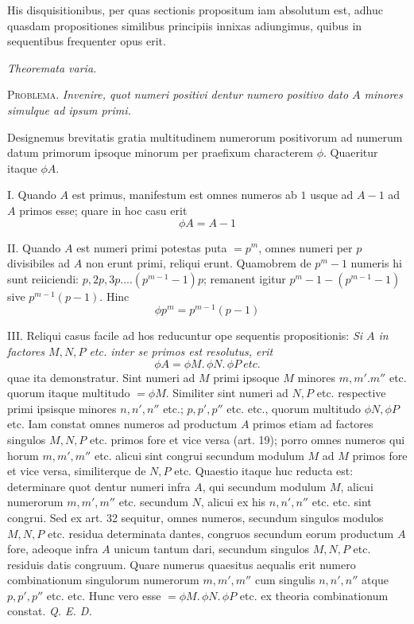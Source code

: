 His disquisitionibus, per quas sectionis propositum iam absolutum est, adhuc quasdam propositiones similibus principiis innixas adiungimus, quibus in sequentibus frequenter opus erit.

\begin{center}\emph{Theoremata varia.}\end{center}

\textsc{Problema.} \emph{Invenire, quot numeri positivi dentur numero positivo dato $A$ minores simulque ad ipsum primi.}

Designemus brevitatis gratia multitudinem numerorum positivorum ad numerum datum primorum ipsoque minorum per praefixum characterem $\phi$. Quaeritur itaque $\phi A$.

I. Quando $A$ est primus, manifestum est omnes numeros ab $1$ usque ad $A-1$ ad $A$ primos esse; quare in hoc casu erit
\[\phi A=A-1\]

II. Quando $A$ est numeri primi potestas puta $=p^m$, omnes numeri per $p$ divisibiles ad $A$ non erunt primi, reliqui erunt. Quamobrem de $p^m-1$ numeris hi sunt reiiciendi: $p,2p,3p....(p^{m-1}-1)p$; remanent igitur $p^m-1-(p^{m-1}-1)$ sive $p^{m-1}(p-1)$. Hinc
\[\phi p^m=p^{m-1}(p-1)\]

III. Reliqui casus facile ad hos reducuntur ope sequentis propositionis: \emph{Si $A$ in factores $M,N,P$ etc. inter se primos est resolutus, erit}
\[\phi A=\phi M.\,\phi N.\,\phi P\ \textit{etc.}\]
quae ita demonstratur. Sint numeri ad $M$ primi ipsoque $M$ minores $m,m'.m''$ etc. quorum itaque multitudo $=\phi M$. Similiter sint numeri ad $N,P$ etc. respective primi ipsisque minores $n,n',n''$ etc.; $p,p',p''$ etc. etc., quorum multitudo $\phi N,\phi P$ etc. Iam constat omnes numeros ad productum $A$ primos etiam ad factores singulos $M,N,P$ etc. primos fore et vice versa (art. 19); porro omnes numeros qui horum $m,m',m''$ etc. alicui sint congrui secundum modulum $M$ ad $M$ primos fore et vice versa, similiterque de $N,P$ etc. Quaestio itaque huc reducta est: determinare quot dentur numeri infra $A$, qui secundum modulum $M$, alicui numerorum $m,m',m''$ etc. secundum $N$, alicui ex his $n,n',n''$
etc. etc. sint congrui. Sed ex art. 32 sequitur, omnes numeros, secundum singulos modulos $M,N,P$ etc. residua determinata dantes, congruos secundum eorum productum $A$ fore, adeoque infra $A$ unicum tantum dari, secundum singulos $M,N,P$ etc. residuis datis congruum. Quare numerus quaesitus aequalis erit numero combinationum singulorum numerorum $m,m',m''$ cum singulis $n,n',n''$ atque $p,p',p''$ etc. etc. Hunc vero esse $=\phi M.\,\phi N.\,\phi P$ etc. ex theoria combinationum constat. \emph{Q. E. D.}

